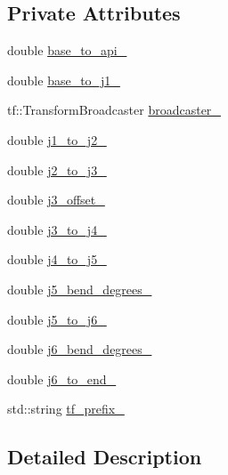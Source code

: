 \subsection*{Private Attributes}
\begin{DoxyCompactItemize}
\item 
double \hyperlink{classjaco_1_1JacoKinematics_a4edc270c1506293993ed77f04409045c}{base\+\_\+to\+\_\+api\+\_\+}
\item 
double \hyperlink{classjaco_1_1JacoKinematics_a7f67ac2a11176769a3477924f46c7284}{base\+\_\+to\+\_\+j1\+\_\+}
\item 
tf\+::\+Transform\+Broadcaster \hyperlink{classjaco_1_1JacoKinematics_a3314f9e6a8fb86405384dd23bd194e46}{broadcaster\+\_\+}
\item 
double \hyperlink{classjaco_1_1JacoKinematics_af9545eaea2e16deaaeea5c1e4db27fe2}{j1\+\_\+to\+\_\+j2\+\_\+}
\item 
double \hyperlink{classjaco_1_1JacoKinematics_ab19fccf28da90214c1aab8f11f1e7b42}{j2\+\_\+to\+\_\+j3\+\_\+}
\item 
double \hyperlink{classjaco_1_1JacoKinematics_ae9e4c7a1d4e000d1697465f2f7ba4a12}{j3\+\_\+offset\+\_\+}
\item 
double \hyperlink{classjaco_1_1JacoKinematics_a873308257c7953e6e98b3229766ee8a4}{j3\+\_\+to\+\_\+j4\+\_\+}
\item 
double \hyperlink{classjaco_1_1JacoKinematics_a5e322eafc0b3b827ae1713d24178c1f8}{j4\+\_\+to\+\_\+j5\+\_\+}
\item 
double \hyperlink{classjaco_1_1JacoKinematics_ad309e89a6e5c60e0f614629c5f1b4c79}{j5\+\_\+bend\+\_\+degrees\+\_\+}
\item 
double \hyperlink{classjaco_1_1JacoKinematics_a156f585f21c8495d3772fb872cace39e}{j5\+\_\+to\+\_\+j6\+\_\+}
\item 
double \hyperlink{classjaco_1_1JacoKinematics_a41a21f1b560c3387855f15059a619994}{j6\+\_\+bend\+\_\+degrees\+\_\+}
\item 
double \hyperlink{classjaco_1_1JacoKinematics_a9e7969fbd9647524c0eef9b8f2ab0f1f}{j6\+\_\+to\+\_\+end\+\_\+}
\item 
std\+::string \hyperlink{classjaco_1_1JacoKinematics_a0efb1f0ad1937553c7e285b27da0bdd3}{tf\+\_\+prefix\+\_\+}
\end{DoxyCompactItemize}


\subsection{Detailed Description}


